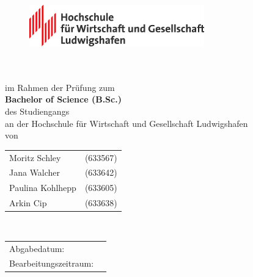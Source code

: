 \thispagestyle{empty}
\begin{titlepage}
\enlargethispage{4cm}

\begin{figure}[ht]
	\centering
	\includegraphics[height=1.8cm]{Bilder/Logos/Logo_HWG-Lu.jpg}
\end{figure} 
\vspace*{0.1cm}

\begin{center}
	\huge{\textbf{\titel}}\\[1.5cm]
	\Large{\textbf{\arbeit}}\\[0.5cm]
	\normalsize{im Rahmen der Prüfung zum\\[1ex] \textbf{Bachelor of Science (B.Sc.)}}\\[0.5cm]
	\Large{des Studiengangs \studiengang}\\[1ex]
	\normalsize{an der Hochschule für Wirtschaft und Gesellschaft Ludwigshafen}\\[1cm]
	\normalsize{von}\\[1ex] \begin{tabular}{ll}
	Moritz Schley 		& (633567) \\
	Jana Walcher 		& (633642) \\
	Paulina Kohlhepp 	& (633605) \\
	Arkin Cip 			& (633638) \\
		
	\end{tabular}\\[5cm]
\end{center}

\begin{center}
	\begin{tabular}{ll}
		Abgabedatum:                     & \abgabe \\[0.2cm]
		Bearbeitungszeitraum:            & \bearbeitungszeitraum \\[0.2cm]
	\end{tabular} 
\end{center}
\end{titlepage}
